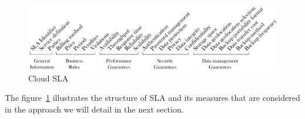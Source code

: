 \begin{figure}[h!]
\center
\includegraphics[scale=0.57]{Cloud_SLA.pdf}
\caption{Cloud SLA}\label{fig:cloudsla}
\end{figure}

The figure~\ref{fig:cloudsla} illustrates the structure of SLA
and its measures that are considered in the approach we will detail in the next
section.